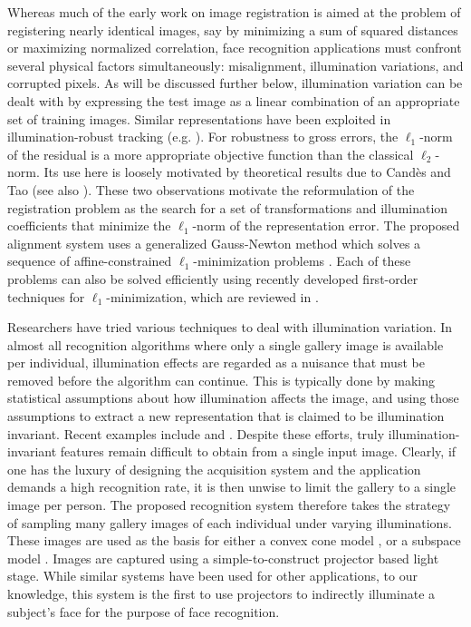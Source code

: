 Whereas much of the early work on image registration is aimed at the problem of
registering nearly identical images, say by minimizing a sum of squared
distances or maximizing normalized correlation, face recognition applications
must confront several physical factors simultaneously: misalignment,
illumination variations, and corrupted pixels.  As will be discussed further
below, illumination variation can be dealt with by expressing the test image as
a linear combination of an appropriate set of training images. Similar
representations have been exploited in illumination-robust tracking (e.g.
\cite{Belhumeur1999-PAA,Murase1995-IJCV}).  For robustness to gross errors, the
$\ell_1$-norm of the residual is a more appropriate objective function than the
classical $\ell_2$-norm. Its use here is loosely motivated by theoretical
results due to Cand\`{e}s and Tao \cite{CandesE2005-IT} (see also
\cite{Wright2008-IT}). These two observations motivate the reformulation of the
registration problem as the search for a set of transformations and
illumination coefficients that minimize the $\ell_1$-norm of the representation
error.  The proposed alignment system uses a generalized Gauss-Newton method
which solves a sequence of affine-constrained $\ell_1$-minimization
problems \cite{Osborne1990-JAMSSB,Jittorntrum1980-NM}. Each of these problems
can also be solved efficiently using recently developed first-order techniques
for $\ell_1$-minimization, which are reviewed in \cite{YangA2010-pp}.

Researchers have tried various techniques to deal with illumination variation.
In almost all recognition algorithms where only a single gallery image is
available per individual, illumination effects are regarded as a nuisance that
must be removed before the algorithm can continue.  This is typically done by
making statistical assumptions about how illumination affects the image, and
using those assumptions to extract a new representation that is claimed to be
illumination invariant.  Recent examples include \cite{chen2006total} and
\cite{zhou2007appearance}.  Despite these efforts, truly
illumination-invariant features remain difficult to obtain from a single input
image.  Clearly, if one has the luxury of designing the acquisition system
and the application demands a high recognition rate,
it is then unwise to limit the gallery to a
single image per person.  The proposed recognition system therefore takes the strategy of sampling many
gallery images of each individual under varying illuminations.  These images
are used as the basis for either a convex cone model
\cite{Georghiades2001-PAMI,belhumeur1998set}, or a subspace model
\cite{Basri2003-PAMI}.  Images are captured using a simple-to-construct
projector based light stage.  While similar systems have been used for
other applications, to our knowledge, this
system is the first to use projectors to indirectly illuminate a subject's face for
the purpose of face recognition.

